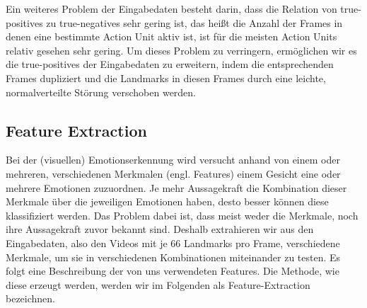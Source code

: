 Ein weiteres Problem der Eingabedaten besteht darin, dass die Relation von true-positives zu true-negatives sehr gering ist, das heißt die Anzahl der Frames
in denen eine bestimmte Action Unit aktiv ist, ist für die meisten Action Units relativ gesehen sehr gering.\newline
Um dieses Problem zu verringern, ermöglichen wir es die true-positives der Eingabedaten zu erweitern, indem die entsprechenden Frames dupliziert
und die Landmarks in diesen Frames durch eine leichte, normalverteilte Störung verschoben werden.


\subsection{Feature Extraction}
Bei der (visuellen) Emotionserkennung wird versucht anhand von einem oder mehreren, verschiedenen Merkmalen (engl. Features)
einem Gesicht eine oder mehrere Emotionen zuzuordnen. Je mehr Aussagekraft die Kombination dieser Merkmale über die jeweiligen Emotionen haben,
desto besser können diese klassifiziert werden. Das Problem dabei ist, dass meist weder die Merkmale, noch
ihre Aussagekraft zuvor bekannt sind. Deshalb extrahieren wir aus den Eingabedaten, also den Videos mit je 66 Landmarks pro
Frame, verschiedene Merkmale, um sie in verschiedenen Kombinationen miteinander zu testen. Es folgt eine Beschreibung
der von uns verwendeten Features. Die Methode, wie diese erzeugt werden, werden wir im Folgenden als Feature-Extraction bezeichnen.

